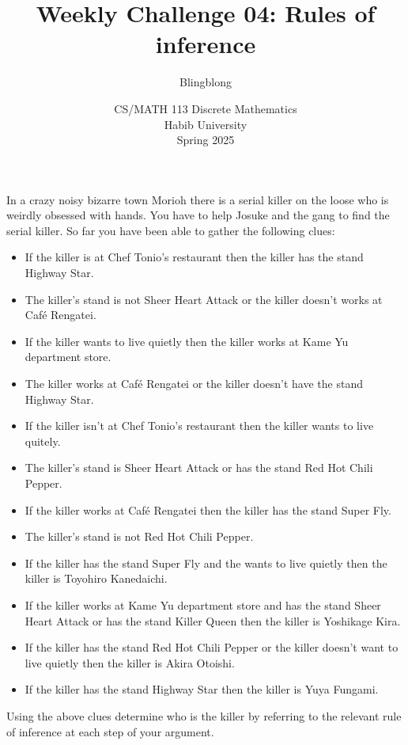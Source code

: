 \documentclass[a4paper]{exam}
\title{Weekly Challenge 04: Rules of inference}
\author{Blingblong} %
\date{CS/MATH 113 Discrete Mathematics\\Habib University\\Spring 2025}
\begin{document}
\maketitle


\begin{questions}
    In a crazy noisy bizarre town Morioh there is a serial killer on the loose who is weirdly obsessed with hands. You have to help Josuke and the gang to find the serial killer. So far you have been able to gather the following clues:
    \begin{itemize}
        \item If the killer is at Chef Tonio's restaurant then the killer has the stand Highway Star.
        \item The killer's stand is not Sheer Heart Attack or the killer doesn't works at Café Rengatei.
        \item If the killer wants to live quietly then the killer works at Kame Yu department store.
        \item The killer works at Café Rengatei or the killer doesn't have the stand Highway Star.
        \item If the killer isn't at Chef Tonio's restaurant then the killer wants to live quitely.
        \item The killer's stand is Sheer Heart Attack or has the stand Red Hot Chili Pepper.
        \item If the killer works at Café Rengatei then the killer has the stand Super Fly.
        \item The killer's stand is not Red Hot Chili Pepper.
        \item If the killer has the stand Super Fly and the wants to live quietly then the killer is Toyohiro Kanedaichi.
        \item If the killer works at Kame Yu department store and has the stand Sheer Heart Attack or has the stand Killer Queen then the killer is Yoshikage Kira.
        \item If the killer has the stand Red Hot Chili Pepper or the killer doesn't want to live quietly then the killer is Akira Otoishi. 
        \item If the killer has the stand Highway Star then the killer is Yuya Fungami.
    \end{itemize}
    Using the above clues determine who is the killer by referring to the relevant rule of inference at each step of your argument.
    \begin{solution}
    \end{solution}




\end{questions}
\end{document}
